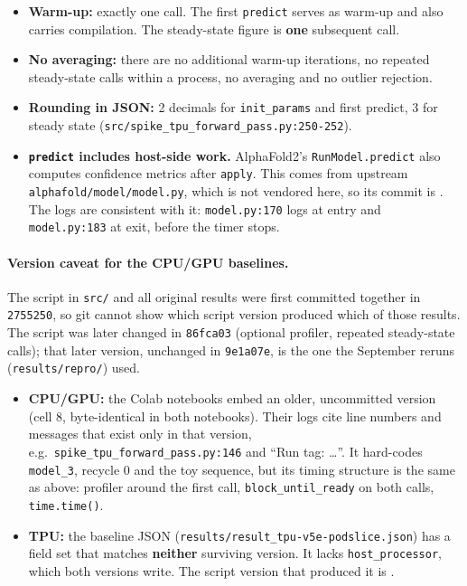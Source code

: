 \begin{itemize}
  \item \textbf{Warm-up:} exactly one call. The first \texttt{predict} serves as warm-up and also
    carries compilation. The steady-state figure is \textbf{one} subsequent call.
  \item \textbf{No averaging:} there are no additional warm-up iterations, no repeated
    steady-state calls within a process, no averaging and no outlier rejection.
  \item \textbf{Rounding in JSON:} 2 decimals for \texttt{init\_params} and first predict, 3 for
    steady state (\texttt{src/\allowbreak{}spike\_\allowbreak{}tpu\_\allowbreak{}forward\_\allowbreak{}pass.py:250-252}).
  \item \textbf{\texttt{predict} includes host-side work.} AlphaFold2's \texttt{RunModel.predict} also
    computes confidence metrics after \texttt{apply}. This comes from upstream
    \texttt{alphafold/\allowbreak{}model/\allowbreak{}model.py}, which is not vendored here, so its commit is
    . The logs are consistent with it: \texttt{model.py:170} logs at entry
    and \texttt{model.py:183} at exit, before the timer stops.
\end{itemize}

\paragraph{Version caveat for the CPU/GPU baselines.} The script in \texttt{src/} and all original
results were first committed together in \texttt{2755250}, so git cannot show which script
version produced which of those results. The script was later changed in \texttt{86fca03}
(optional profiler, repeated steady-state calls); that later version, unchanged in
\texttt{9e1a07e}, is the one the September reruns (\texttt{results/\allowbreak{}repro/}) used.
\begin{itemize}
  \item \textbf{CPU/GPU:} the Colab notebooks embed an older, uncommitted version (cell 8,
    byte-identical in both notebooks). Their logs cite line numbers and messages
    that exist only in that version, e.g.\ \texttt{spike\_\allowbreak{}tpu\_\allowbreak{}forward\_\allowbreak{}pass.py:146} and
    ``Run tag: \ldots''. It hard-codes \texttt{model\_3}, recycle 0 and the toy sequence, but its
    timing structure is the same as above: profiler around the first call,
    \texttt{block\_until\_ready} on both calls, \texttt{time.time()}.
  \item \textbf{TPU:} the baseline JSON (\texttt{results/\allowbreak{}result\_\allowbreak{}tpu-v5e-podslice.json}) has a field
    set that matches \textbf{neither} surviving version. It lacks \texttt{host\_processor}, which
    both versions write. The script version that produced it is .
\end{itemize}

